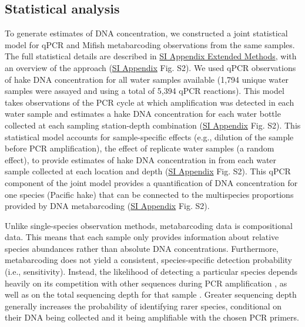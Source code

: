\documentclass{article}
\begin{document}
\subsection*{Statistical analysis}
To generate estimates of DNA concentration, we constructed a joint statistical model for qPCR and Mifish metabarcoding observations from the same samples. The full statistical details are described in \href{SI_Appendix.pdf}{SI Appendix Extended Methods}, with an overview of the approach (\href{SI_Appendix.pdf}{SI Appendix} Fig. S2). We used qPCR observations of hake DNA concentration for all water samples available (1,794 unique water samples were assayed and using a total of 5,394 qPCR reactions). This model takes observations of the PCR cycle at which amplification was detected in each water sample and estimates a hake DNA concentration for each water bottle collected at each sampling station-depth combination (\href{SI_Appendix.pdf}{SI Appendix} Fig. S2). This statistical model accounts for sample-specific effects (e.g., dilution of the sample before PCR amplification), the effect of replicate water samples (a random effect), to provide estimates of hake DNA concentration in from each water sample collected at each location and depth (\href{SI_Appendix.pdf}{SI Appendix} Fig. S2). This qPCR component of the joint model provides a quantification of DNA concentration for one species (Pacific hake) that can be connected to the multispecies proportions provided by DNA metabarcoding (\href{SI_Appendix.pdf}{SI Appendix} Fig. S2).

Unlike single-species observation methods, metabarcoding data is compositional data. This means that each sample only provides information about relative species abundances rather than absolute DNA concentrations. Furthermore, metabarcoding does not yield a consistent, species-specific detection probability (i.e., sensitivity). Instead, the likelihood of detecting a particular species depends heavily on its competition with other sequences during PCR amplification \cite{shelton2023}, as well as on the total sequencing depth for that sample \cite{kelly2019}. Greater sequencing depth generally increases the probability of identifying rarer species, conditional on their DNA being collected and it being amplifiable with the chosen PCR primers.
\end{document}
